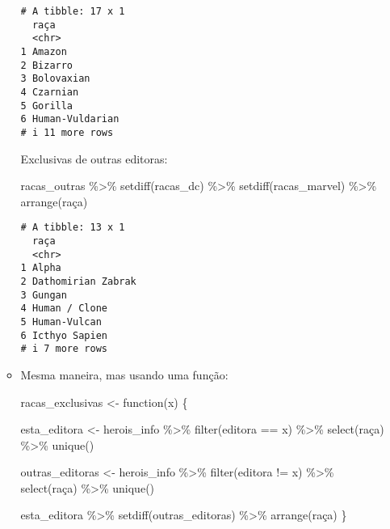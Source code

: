 \documentclass[
  letterpaper,
  DIV=11,
  numbers=noendperiod]{scrreprt}
\newenvironment{Shaded}{\begin{snugshade}}{\end{snugshade}}
\newcommand{\ControlFlowTok}[1]{\textcolor[rgb]{0.00,0.23,0.31}{#1}}
\newcommand{\FunctionTok}[1]{\textcolor[rgb]{0.28,0.35,0.67}{#1}}
\newcommand{\NormalTok}[1]{\textcolor[rgb]{0.00,0.23,0.31}{#1}}
\newcommand{\OtherTok}[1]{\textcolor[rgb]{0.00,0.23,0.31}{#1}}
\newcommand{\SpecialCharTok}[1]{\textcolor[rgb]{0.37,0.37,0.37}{#1}}
\begin{document}
\begin{enumerate}
\begin{tcolorbox}
\begin{itemize}
\begin{verbatim}
# A tibble: 17 x 1
  raça           
  <chr>          
1 Amazon         
2 Bizarro        
3 Bolovaxian     
4 Czarnian       
5 Gorilla        
6 Human-Vuldarian
# i 11 more rows
\end{verbatim}

    Exclusivas de outras editoras:

\begin{Shaded}
\begin{Highlighting}[]
\NormalTok{racas\_outras }\SpecialCharTok{\%\textgreater{}\%} 
  \FunctionTok{setdiff}\NormalTok{(racas\_dc) }\SpecialCharTok{\%\textgreater{}\%} 
  \FunctionTok{setdiff}\NormalTok{(racas\_marvel) }\SpecialCharTok{\%\textgreater{}\%} 
  \FunctionTok{arrange}\NormalTok{(raça)}
\end{Highlighting}
\end{Shaded}

\begin{verbatim}
# A tibble: 13 x 1
  raça              
  <chr>             
1 Alpha             
2 Dathomirian Zabrak
3 Gungan            
4 Human / Clone     
5 Human-Vulcan      
6 Icthyo Sapien     
# i 7 more rows
\end{verbatim}
  \item
    Mesma maneira, mas usando uma função:

\begin{Shaded}
\begin{Highlighting}[]
\NormalTok{racas\_exclusivas }\OtherTok{\textless{}{-}} \ControlFlowTok{function}\NormalTok{(x) \{}

\NormalTok{  esta\_editora }\OtherTok{\textless{}{-}}\NormalTok{ herois\_info }\SpecialCharTok{\%\textgreater{}\%} 
    \FunctionTok{filter}\NormalTok{(editora }\SpecialCharTok{==}\NormalTok{ x) }\SpecialCharTok{\%\textgreater{}\%} 
    \FunctionTok{select}\NormalTok{(raça) }\SpecialCharTok{\%\textgreater{}\%} 
    \FunctionTok{unique}\NormalTok{()}

\NormalTok{  outras\_editoras }\OtherTok{\textless{}{-}}\NormalTok{ herois\_info }\SpecialCharTok{\%\textgreater{}\%} 
    \FunctionTok{filter}\NormalTok{(editora }\SpecialCharTok{!=}\NormalTok{ x) }\SpecialCharTok{\%\textgreater{}\%} 
    \FunctionTok{select}\NormalTok{(raça) }\SpecialCharTok{\%\textgreater{}\%} 
    \FunctionTok{unique}\NormalTok{()}

\NormalTok{  esta\_editora }\SpecialCharTok{\%\textgreater{}\%}
    \FunctionTok{setdiff}\NormalTok{(outras\_editoras) }\SpecialCharTok{\%\textgreater{}\%} 
    \FunctionTok{arrange}\NormalTok{(raça)}
\NormalTok{\}}
\end{Highlighting}
\end{Shaded}


\end{itemize}
\end{tcolorbox}
\end{enumerate}
\end{document}
